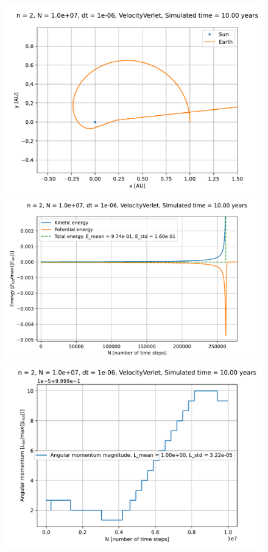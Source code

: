 \documentclass[reprint,english,notitlepage]{revtex4-1}  %
\begin{document}
\begin{figure}[H]
\includegraphics[width=\columnwidth]{../data/figures/varyingbeta/se_peturbed_beta3_vv_orbits2D.pdf}
\includegraphics[width=\columnwidth]{../data/figures/varyingbeta/se_peturbed_beta3_vv_energy_zoomed.pdf}
\includegraphics[width=\columnwidth]{../data/figures/varyingbeta/se_peturbed_beta3_vv_angmom.pdf}

\end{figure}
\end{document}
